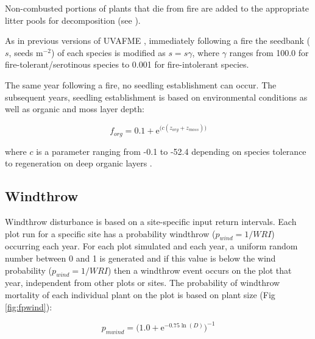 \documentclass[a4paper, 12pt] {report}
\begin{document}
Non-combusted portions of plants that die from fire are added to the appropriate litter pools for decomposition (see ).

As in previous versions of UVAFME \cite{fosterImportanceTreeSpecieslevel2019, shumanFireDisturbanceClimate2017, fosterModelingInteractiveEffects2018}, immediately following a fire the seedbank ($s$, seeds m$^{-2}$) of each species is modified as $s = s\gamma$, where $\gamma$ ranges from 100.0 for fire-tolerant/serotinous species to 0.001 for fire-intolerant species.

The same year following a fire, no seedling establishment can occur. The subsequent years, seedling establishment is based on environmental conditions \cite{fosterImportanceTreeSpecieslevel2019} as well as organic and moss layer depth:

\begin{equation}
	f_{org} = 0.1 + \text{e}^{\Big(c(z_{org} + z_{moss})\Big)}
\end{equation}

where $c$ is a parameter ranging from -0.1 to -52.4 depending on species tolerance to regeneration on deep organic layers \cite{fosterImportanceTreeSpecieslevel2019}.

\subsection{Windthrow}

Windthrow disturbance is based on a site-specific input return intervals. Each plot run for a specific site has a probability windthrow ($p_{wind} = 1/WRI$) occurring each year. For each plot simulated and each year, a uniform random number between 0 and 1 is generated and if this value is below the wind probability ($p_{wind} = 1/WRI$) then a windthrow event occurs on the plot that year, independent from other plots or sites. The probability of windthrow mortality of each individual plant on the plot is based on plant size  (Fig \ref{fig:fpwind}):

\begin{equation}  \label{pwind}
p_{mwind} = \Big(1.0 + \text{e}^{-0.75\ln(D)}\Big)^{-1}
\end{equation}
\end{document}
